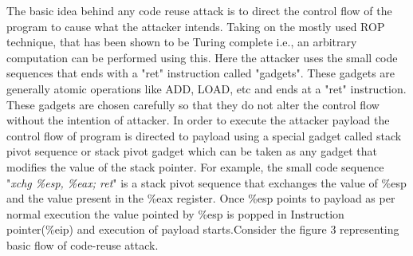 \documentclass{article}
\begin{document}
\begin{multicols}{2}
	The basic idea behind any code reuse attack is to direct the control flow of the program to cause what the attacker intends. Taking on the mostly used ROP technique, that has been shown to be Turing complete i.e., an arbitrary computation can be performed using this. Here the attacker uses the small code sequences that ends with a "ret" instruction called "gadgets". These gadgets are generally atomic operations like ADD, LOAD, etc and ends at a "ret" instruction. These gadgets are chosen carefully so that they do not alter the control flow without the intention of attacker. In order to execute the attacker payload the control flow of program is directed to payload using a special gadget called stack pivot sequence or stack pivot gadget which can be taken as any gadget that modifies the value of the stack pointer. For example, the small code sequence "\emph{xchg \%esp, \%eax; ret}" is a stack pivot sequence that exchanges the value of \%esp and the value present in the \%eax register. Once \%esp points to payload as per normal execution the value pointed by \%esp is popped in Instruction pointer(\%eip) and execution of payload starts.\break  Consider the figure 3 representing basic flow of code-reuse attack.
	

\end{multicols}
\end{document}
